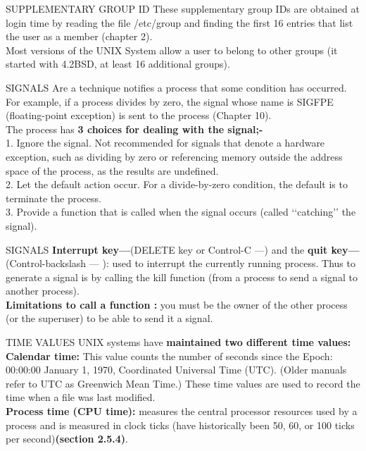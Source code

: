 \documentclass{beamer}
\begin{document}
\begin{frame}[t]{SUPPLEMENTARY GROUP ID}
These supplementary group IDs are obtained at login time by reading the file /etc/group and finding the first 16 entries that list the user as a member (chapter 2).\\[6pt]
Most versions of the UNIX System allow a user to belong to other groups (it started with 4.2BSD, at least 16 additional groups).


\end{frame}
\begin{frame}[t]{SIGNALS}
Are a technique notifies a process that some condition has occurred. For example, if a process divides by zero, the signal whose name is SIGFPE (floating-point exception) is sent to the process (Chapter 10).
\\[6pt]The process has \textbf{3 choices for dealing with the signal;-} 
\\[6pt]1. Ignore the signal. Not recommended for signals that denote a hardware exception, such as dividing by zero or referencing memory outside the address space of the process, as the results are undefined.
\\[6pt]2. Let the default action occur. For a divide-by-zero condition, the default is to terminate the process.
\\[6pt]3. Provide a function that is called when the signal occurs (called ‘‘catching’’ the signal). 


\end{frame}
\begin{frame}[t]{SIGNALS}
\textbf{Interrupt key—}(DELETE key or Control-C —) and the \textbf{quit key—}(Control-backslash — ): used to interrupt the currently running process. Thus to generate a signal is by calling the kill function (from a process to send a signal to another process).\\[6pt]
\textbf{Limitations to call a function :} you must be the owner of the other process (or the superuser) to be able to send it a signal.


\end{frame}
\begin{frame}[t]{TIME VALUES}
UNIX systems have \textbf{maintained two different time values:}
\textbf{Calendar time:} This value counts the number of seconds since the Epoch: 00:00:00 January 1, 1970, Coordinated Universal Time (UTC). (Older manuals refer to UTC as Greenwich Mean Time.) These time values are used to record the time when a file was last modified.
\\[6pt]\textbf{Process time (CPU time):} measures the central processor resources used by a process and is measured in clock ticks (have historically been 50, 60, or 100 ticks per second)\textbf{(section 2.5.4)}.

\end{frame}
\end{document}
